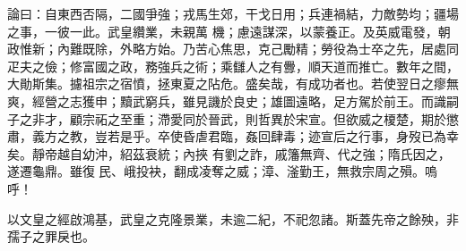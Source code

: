 \begin{pinyinscope}
 論曰：自東西否隔，二國爭強；戎馬生郊，干戈日用；兵連禍結，力敵勢均；疆場之事，一彼一此。武皇纘業，未親萬
 機；慮遠謀深，以蒙養正。及英威電發，朝政惟新；內難既除，外略方始。乃苦心焦思，克己勵精；勞役為士卒之先，居處同疋夫之儉；修富國之政，務強兵之術；乘讎人之有釁，順天道而推亡。數年之間，大勛斯集。攄祖宗之宿憤，拯東夏之阽危。盛矣哉，有成功者也。若使翌日之瘳無爽，經營之志獲申；黷武窮兵，雖見譏於良史；雄圖遠略，足方駕於前王。而識嗣子之非才，顧宗祏之至重；滯愛同於晉武，則哲異於宋宣。但欲威之榎楚，期於懲肅，義方之教，豈若是乎。卒使昏虐君臨，姦回肆毒；迹宣后之行事，身歿已為幸矣。靜帝越自幼沖，紹茲衰統；內挾
 有劉之詐，戚籓無齊、代之強；隋氏因之，遂遷龜鼎。雖復民、峨投袂，翻成凌奪之威；漳、滏勤王，無救宗周之殞。嗚呼！



 以文皇之經啟鴻基，武皇之克隆景業，未逾二紀，不祀忽諸。斯蓋先帝之餘殃，非孺子之罪戾也。



\end{pinyinscope}